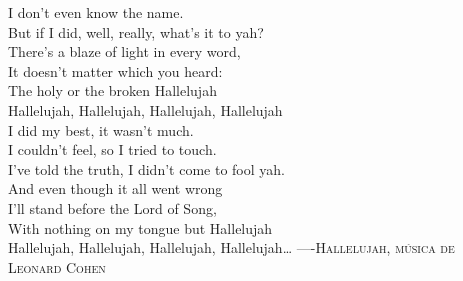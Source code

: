 \begin{titlepage}
\begin{fullwidth}
\begin{epigraphs}
{I don't even know the name.\\
But if I did, well, really, what's it to yah?\\
There's a blaze of light in every word,\\
It doesn't matter which you heard:\\
The holy or the broken Hallelujah\\[1.5ex]
Hallelujah, Hallelujah, Hallelujah, Hallelujah\\[1.5ex]
I did my best, it wasn't much.\\
I couldn't feel, so I tried to touch.\\
I've told the truth, I didn't come to fool yah.\\
And even though it all went wrong\\
I'll stand before the Lord of Song,\\
With nothing on my tongue but Hallelujah\\[1.5ex]
Hallelujah, Hallelujah, Hallelujah, Hallelujah\ldots}
{----\textsc{Hallelujah, música de Leonard Cohen}}

\end{epigraphs}
\end{fullwidth}
\end{titlepage}